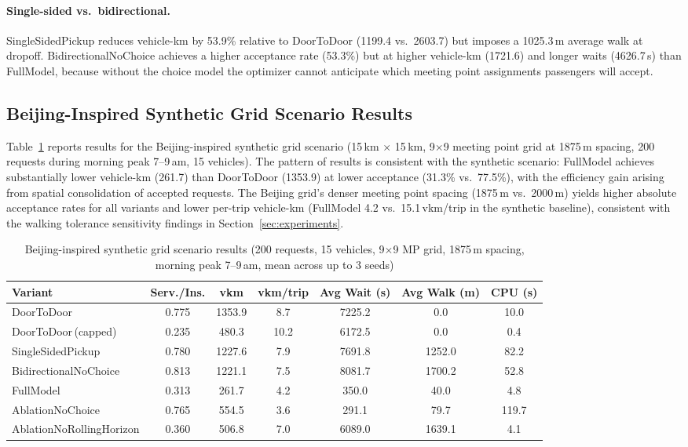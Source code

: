 \paragraph{Single-sided vs.\ bidirectional.}
SingleSidedPickup reduces vehicle-km by 53.9\% relative to DoorToDoor
(1199.4 vs.\ 2603.7) but imposes a 1025.3\,m average walk at dropoff.
BidirectionalNoChoice achieves a higher acceptance rate (53.3\%) but at
higher vehicle-km (1721.6) and longer waits (4626.7\,s) than FullModel,
because without the choice model the optimizer cannot anticipate which
meeting point assignments passengers will accept.

\subsection{Beijing-Inspired Synthetic Grid Scenario Results}\label{subsec:beijing}

Table~\ref{tab:beijing-results} reports results for the Beijing-inspired synthetic grid
scenario (15\,km $\times$ 15\,km, 9$\times$9 meeting point grid at 1875\,m spacing,
200 requests during morning peak 7--9\,am, 15 vehicles). The pattern of results
is consistent with the synthetic scenario: FullModel achieves substantially lower
vehicle-km (261.7) than DoorToDoor (1353.9) at lower acceptance (31.3\% vs.\
77.5\%), with the efficiency gain arising from spatial consolidation of accepted
requests. The Beijing grid's denser meeting point spacing (1875\,m vs.\ 2000\,m)
yields higher absolute acceptance rates for all variants and lower per-trip
vehicle-km (FullModel 4.2 vs.\ 15.1\,vkm/trip in the synthetic baseline),
consistent with the walking tolerance sensitivity findings in
Section~\ref{sec:experiments}.

\begin{table}[h]
\centering
\caption{Beijing-inspired synthetic grid scenario results (200 requests, 15 vehicles, 9$\times$9 MP grid,
         1875\,m spacing, morning peak 7--9\,am, mean across up to 3 seeds)}
\label{tab:beijing-results}
\begin{tabular}{lcccccc}
\toprule
Variant & Serv./Ins. & vkm & vkm/trip & Avg Wait (s) & Avg Walk (m) & CPU (s) \\
\midrule
DoorToDoor               & 0.775 & 1353.9 & 8.7 & 7225.2 & 0.0    & 10.0 \\
DoorToDoor\,(capped)     & 0.235 & 480.3  & 10.2& 6172.5 & 0.0    & 0.4  \\
SingleSidedPickup        & 0.780 & 1227.6 & 7.9 & 7691.8 & 1252.0 & 82.2 \\
BidirectionalNoChoice    & 0.813 & 1221.1 & 7.5 & 8081.7 & 1700.2 & 52.8 \\
FullModel                & 0.313 & 261.7  & 4.2 & 350.0  & 40.0   & 4.8  \\
AblationNoChoice         & 0.765 & 554.5  & 3.6 & 291.1  & 79.7   & 119.7 \\
AblationNoRollingHorizon & 0.360 & 506.8  & 7.0 & 6089.0 & 1639.1 & 4.1  \\
\bottomrule
\end{tabular}
\end{table}

